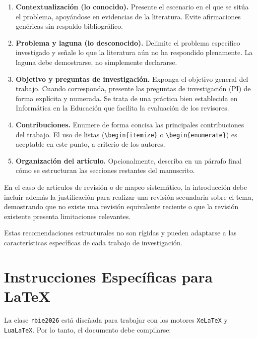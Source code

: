 \documentclass[spanish]{rbie2026}%
\begin{document}
\begin{enumerate}
  \item \textbf{Contextualización (lo conocido).} Presente el escenario en el que se sitúa el problema, apoyándose en evidencias de la literatura. Evite afirmaciones genéricas sin respaldo bibliográfico.

  \item \textbf{Problema y laguna (lo desconocido).} Delimite el problema específico investigado y señale lo que la literatura aún no ha respondido plenamente. La laguna debe demostrarse, no simplemente declararse.

  \item \textbf{Objetivo y preguntas de investigación.} Exponga el objetivo general del trabajo. Cuando corresponda, presente las preguntas de investigación (PI) de forma explícita y numerada. Se trata de una práctica bien establecida en Informática en la Educación que facilita la evaluación de los revisores.

  \item \textbf{Contribuciones.} Enumere de forma concisa las principales contribuciones del trabajo. El uso de listas (\texttt{\textbackslash begin\{itemize\}} o \texttt{\textbackslash begin\{enumerate\}}) es aceptable en este punto, a criterio de los autores.

  \item \textbf{Organización del artículo.} Opcionalmente, describa en un párrafo final cómo se estructuran las secciones restantes del manuscrito.
\end{enumerate}

En el caso de artículos de revisión o de mapeo sistemático, la introducción debe incluir además la justificación para realizar una revisión secundaria sobre el tema, demostrando que no existe una revisión equivalente reciente o que la revisión existente presenta limitaciones relevantes.

Estas recomendaciones estructurales no son rígidas y pueden adaptarse a las características específicas de cada trabajo de investigación.


\section{Instrucciones Específicas para \LaTeX}
\label{sec:latex}

La clase \texttt{rbie2026} está diseñada para trabajar con los motores \texttt{XeLaTeX} y \texttt{LuaLaTeX}. Por lo tanto, el documento debe compilarse:
\end{document}
